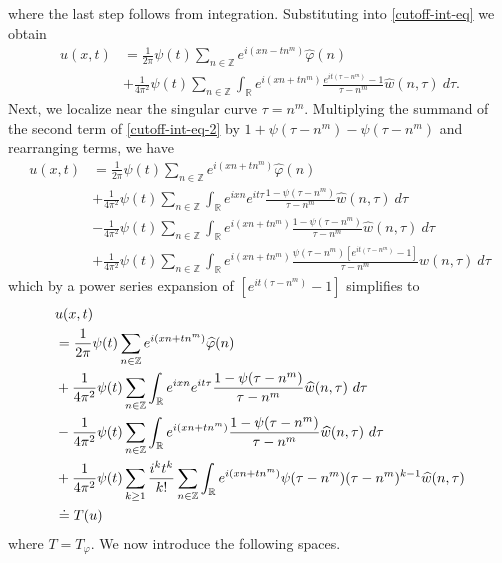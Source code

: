 \documentclass[12pt,reqno]{amsart}
\numberwithin{equation}{section}  %
\numberwithin{figure}{section}
\newcommand{\rr}{\mathbb{R}}
\newcommand{\zz}{\mathbb{Z}}
\newcommand{\wh}{\widehat}
\newcommand{\vp}{\varphi}
\theoremstyle{plain}
\theoremstyle{definition}
\theoremstyle{remark}
\begin{document}
%
%
where the last step follows from integration. Substituting
into \eqref{cutoff-int-eq} we obtain
%
%
\begin{equation}
	\begin{split}
		\label{cutoff-int-eq-2}
		u(x, t)
		& = \frac{1}{2 \pi} \psi(t) \sum_{n \in \zz} e^{i(xn - tn^{m })} \widehat{\vp}(n) 
		\\
		& + \frac{1}{4 \pi^2} \psi(t) \sum_{n \in \zz} \int_\rr
		e^{i(xn + t n^m)} \frac{e^{it(\tau - n^m)}- 1}{\tau - n^m} 
		\wh{w}(n, \tau) \ d \tau.
	\end{split}
\end{equation}
%
%
%
%
%
Next, we localize near the singular curve $\tau =  n^m$.  Multiplying the
summand of the second term of \eqref{cutoff-int-eq-2} by $1 + \psi(\tau -
n^m) - \psi(\tau -
n^m) $ and
rearranging terms, we have
%
%
\begin{equation*}
	\begin{split}
		 u(x, t)
		& = \frac{1}{2 \pi} \psi(t) \sum_{n \in \zz} e^{i(xn + t n^{m 
		})} \widehat{\vp}(n) 
		\\
		& + \frac{1}{4 \pi^2} \psi(t) \sum_{n \in \zz} \int_\rr e^{ixn}  
		e^{it \tau} \frac{ 1 - \psi(\tau - n^m) 
		}{\tau - n^m} \wh{w}(n, \tau) \ d \tau
		\\
		& - \frac{1}{4 \pi^2} \psi(t) \sum_{n \in \zz} \int _\rr e^{i(xn + 
		t n^m)}
		 \frac{1- \psi(\tau - n^m)}{\tau - n^m} \wh{w}(n, \tau) \ d \tau
		\\
		& + \frac{1}{4 \pi^2} \psi(t) \sum_{n \in \zz} \int_\rr
		e^{i(xn + t n^m)}
		\frac{\psi(\tau - n^m)\left[ e^{it(\tau - n^m)}-1 
		\right]}{\tau - n^m} \wh{w}(n, \tau) \ d \tau
	\end{split}
\end{equation*}
%
%
which by a power series expansion of $[e^{it(\tau - n^m)}-1]$ simplifies  
to
%
%
\begin{align}
	\label{main-int-expression-0}
	& u(x, t) 
		\\
		\label{main-int-expression-1}
		& = \frac{1}{2 \pi} \psi(t) \sum_{n \in \zz} e^{i(xn + tn^{m 
		})} \widehat{\vp}(n) 
		\\
		\label{main-int-expression-2}
		& + \frac{1}{4 \pi^2} \psi(t) \sum_{n\in \zz} \int_\rr e^{ixn}  
		e^{it \tau} \frac{ 1 - \psi(\tau -  n^m) 
		}{\tau -  n^m} \wh{w}(n, \tau) \ d \tau
		\\
		\label{main-int-expression-3}
		& - \frac{1}{4 \pi^2} \psi(t) \sum_{n\in \zz} \int_\rr e^{i(xn + 
		t n^m)}
		 \frac{1- \psi(\tau -  n^m)}{\tau -  n^m} \wh{w}(n, \tau) \ d \tau
		\\
		\label{main-int-expression-4}
		& + \frac{1}{4 \pi^2} \psi(t) \sum_{k \ge 1} \frac{i^k t^k}{k!}
		\sum_{n \in \zz} \int_\rr e^{i(xn + t n^m )}
		\psi(\tau -  n^m) (\tau -  n^m)^{k-1} \wh{w}(n, \tau)  
		\\
		& \doteq T(u) \notag
\end{align}
%
%
where $T = T_{\vp}$. We now introduce the following spaces. 
\end{document}
